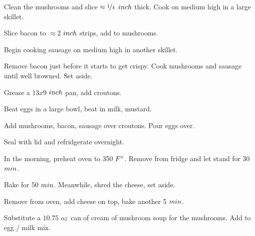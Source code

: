 \begin{preparation}
\item Clean the mushrooms and slice $\approx\onefourth$ $\inch$ thick.
	Cook on medium high in a large skillet.

\item Slice bacon to $\approx2$ $\inch$ strips, add to mushrooms.

\item Begin cooking sausage on medium high in another skillet.

\item Remove bacon just before it starts to get crispy.
	Cook mushrooms and sausage until well browned.
	Set aside.

\item Grease a $13x9$ $\inch$ pan, add croutons.

\item Beat eggs in a large bowl, beat in milk, mustard.

\item Add mushrooms, bacon, sausage over croutons.
	Pour eggs over.

\item Seal with lid and refridgerate overnight.

\item In the morning, preheat oven to 350 $\Fahrenheit$.
	Remove from fridge and let stand for 30 $\minute$.

\item Bake for 50 $\minute$.
	Meanwhile, shred the cheese, set aside.

\item Remove from oven, add cheese on top, bake another 5 $\minute$.
\end{preparation}


\begin{variation}
\item Substitute a $10.75$ $\ounce$ can of cream of mushroom soup for the mushrooms.
	Add to egg / milk mix.
\end{variation}


\recipeend
